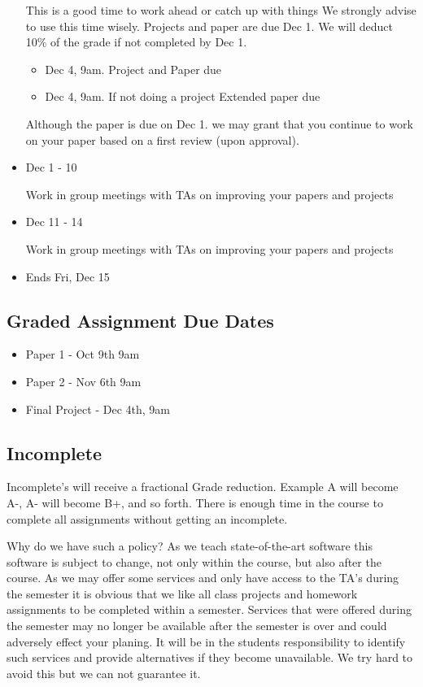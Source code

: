 \begin{itemize}
  This is a good time to work ahead or catch up with things We strongly
  advise to use this time wisely. Projects and paper are due Dec 1. We
  will deduct 10\% of the grade if not completed by Dec 1.

  \begin{itemize}

  \item
    Dec 4, 9am. Project and Paper due
  \item
    Dec 4, 9am. If not doing a project Extended paper due
  \end{itemize}

  Although the paper is due on Dec 1. we may grant that you continue to
  work on your paper based on a first review (upon approval).
\item
  Dec 1 - 10

  Work in group meetings with TAs on improving your papers and projects
\item
  Dec 11 - 14

  Work in group meetings with TAs on improving your papers and projects
\item
  Ends Fri, Dec 15
\end{itemize}

\subsection{Graded Assignment Due
Dates}\label{graded-assignment-due-dates}

\begin{itemize}

\item
  Paper 1 - Oct 9th 9am
\item
  Paper 2 - Nov 6th 9am
\item
  Final Project - Dec 4th, 9am
\end{itemize}

\subsection{Incomplete}\label{incomplete}

Incomplete's will receive a fractional Grade reduction. Example A will
become A-, A- will become B+, and so forth. There is enough time in the
course to complete all assignments without getting an incomplete.

Why do we have such a policy? As we teach state-of-the-art software this
software is subject to change, not only within the course, but also
after the course. As we may offer some services and only have access to
the TA's during the semester it is obvious that we like all class
projects and homework assignments to be completed within a semester.
Services that were offered during the semester may no longer be
available after the semester is over and could adversely effect your
planing. It will be in the students responsibility to identify such
services and provide alternatives if they become unavailable. We try
hard to avoid this but we can not guarantee it.


